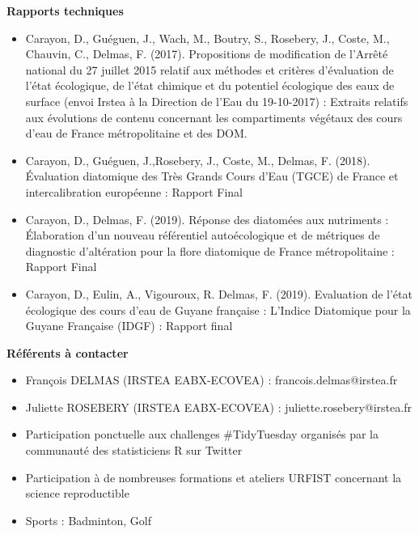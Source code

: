 \documentclass[localFont,alternative]{yaac-another-awesome-cv}
\begin{document}
\textbf{Rapports techniques}
\begin{itemize}
\item Carayon, D., Guéguen, J., Wach, M., Boutry, S., Rosebery, J., Coste, M., Chauvin, C.,  Delmas, F. (2017). Propositions de modification de l'Arrêté national du 27 juillet 2015 relatif aux méthodes et critères d'évaluation de l'état écologique, de l'état chimique et du potentiel écologique des eaux de surface (envoi Irstea à la Direction de l'Eau du 19-10-2017) : Extraits relatifs aux évolutions de contenu concernant les compartiments végétaux des cours d'eau de France métropolitaine et des DOM.
\\
\item Carayon, D., Guéguen, J.,Rosebery, J., Coste, M., Delmas, F. (2018). Évaluation diatomique des Très Grands Cours d’Eau (TGCE) de France et intercalibration européenne : Rapport Final
\\
\item Carayon, D., Delmas, F. (2019). Réponse des diatomées aux nutriments : Élaboration d'un nouveau référentiel autoécologique et de métriques de diagnostic d'altération pour la flore diatomique de France métropolitaine : Rapport Final
\\
\item Carayon, D., Eulin, A., Vigouroux, R. Delmas, F. (2019). Evaluation de l’état écologique des cours d’eau de Guyane française : L’Indice Diatomique pour la Guyane Française (IDGF) : Rapport final





\end{itemize}


\textbf{Référents à contacter}
\begin{itemize}
\item François DELMAS (IRSTEA EABX-ECOVEA) : francois.delmas@irstea.fr\\
\item Juliette ROSEBERY (IRSTEA EABX-ECOVEA) : juliette.rosebery@irstea.fr
\end{itemize}

	


\begin{itemize}
\item Participation ponctuelle aux challenges \#TidyTuesday organisés par la communauté des statisticiens R sur Twitter\\
\item Participation à de nombreuses formations et ateliers URFIST concernant la science reproductible\\
\item Sports : Badminton, Golf
\end{itemize}
\end{document}
